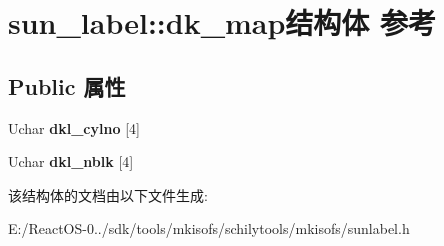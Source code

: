 \hypertarget{structsun__label_1_1dk__map}{}\section{sun\+\_\+label\+:\+:dk\+\_\+map结构体 参考}
\label{structsun__label_1_1dk__map}
\subsection*{Public 属性}
\begin{DoxyCompactItemize}
\item 
\mbox{\label{structsun__label_1_1dk__map_a622749b162620631e240d41e806dfad3}} 
Uchar {\bfseries dkl\+\_\+cylno} \mbox{[}4\mbox{]}
\item 
\mbox{\label{structsun__label_1_1dk__map_a80aba58b074ce294596f3d177995420c}} 
Uchar {\bfseries dkl\+\_\+nblk} \mbox{[}4\mbox{]}
\end{DoxyCompactItemize}


该结构体的文档由以下文件生成\+:\begin{DoxyCompactItemize}
\item 
E\+:/\+React\+O\+S-\/0../sdk/tools/mkisofs/schilytools/mkisofs/sunlabel.\+h\end{DoxyCompactItemize}
